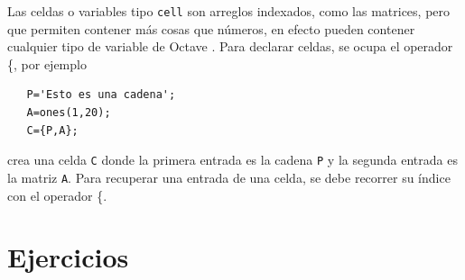 \documentclass[letter,11pt]{article}
\newcommand\0{\mathbf{0}}
\newcommand{\octave}{{\sc Octave }}
\begin{document}
  Las celdas o variables tipo \texttt{cell} son arreglos indexados, como las matrices, pero que permiten contener m\'as cosas que n\'umeros, en efecto pueden contener cualquier tipo de variable de \octave. Para declarar celdas, se ocupa el operador \{, por ejemplo
  \begin{lstlisting}
   P='Esto es una cadena';
   A=ones(1,20);
   C={P,A};
  \end{lstlisting}
  crea una celda \texttt{C} donde la primera entrada es la cadena \texttt{P} y la segunda entrada es la matriz \texttt{A}. 
  Para recuperar una entrada de una celda, se debe recorrer su \'indice con el operador \{.
  

\section{Ejercicios}
\end{document}
